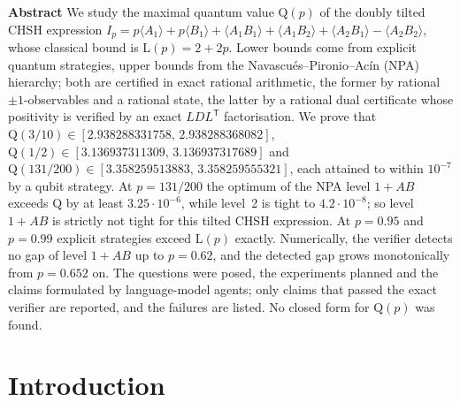 \documentclass[10pt,twocolumn,a4paper]{article}
\theoremstyle{definition}
\theoremstyle{remark}
\newcommand{\Q}{\mathrm{Q}}
\newcommand{\Lc}{\mathrm{L}}
\newcommand{\ev}[1]{\langle #1\rangle}
\begin{document}
\thispagestyle{first}


\noindent\textbf{Abstract}\enspace
We study the maximal quantum value $\Q(p)$ of the doubly tilted CHSH expression
$I_p = p\ev{A_1}+p\ev{B_1}+\ev{A_1B_1}+\ev{A_1B_2}+\ev{A_2B_1}-\ev{A_2B_2}$, whose classical bound is $\Lc(p)=2+2p$.
Lower bounds come from explicit quantum strategies, upper bounds from the Navascu\'es--Pironio--Ac\'in (NPA) hierarchy; both are
certified in exact rational arithmetic, the former by rational $\pm1$-observables and a rational state, the latter by a rational
dual certificate whose positivity is verified by an exact $LDL^{\mathsf T}$ factorisation. We prove that
$\Q(3/10)\in[2.938288331758,\,2.938288368082]$, $\Q(1/2)\in[3.136937311309,\,3.136937317689]$ and
$\Q(131/200)\in[3.358259513883,\,3.358259555321]$, each attained to within $10^{-7}$ by a qubit strategy. At $p=131/200$ the
optimum of the NPA level $1{+}AB$ exceeds $\Q$ by at least $3.25\cdot10^{-6}$, while level~2 is tight to $4.2\cdot10^{-8}$; so
level $1{+}AB$ is strictly not tight for this tilted CHSH expression. At $p=0.95$ and $p=0.99$ explicit strategies exceed $\Lc(p)$
exactly. Numerically, the verifier detects no gap of level $1{+}AB$ up to $p=0.62$, and the detected gap grows monotonically from $p=0.652$ on.
The questions were posed, the experiments planned and the claims formulated by language-model agents; only claims that passed the
exact verifier are reported, and the failures are listed. No closed form for $\Q(p)$ was found.

\section{Introduction}
\end{document}
